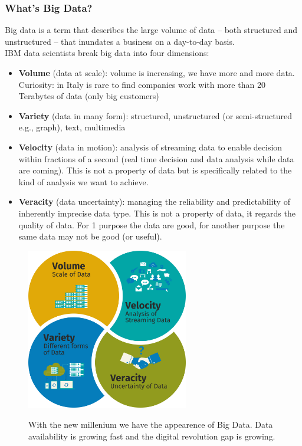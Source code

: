 \documentclass[10pt,a4paper]{article}
\begin{document}
\subsubsection{What's Big Data?}
Big data is a term that describes the large volume of data – both structured and unstructured – that inundates a business on a day-to-day basis. \\
IBM data scientists break big data into four dimensions: 
\begin{itemize}
	\item \textbf{Volume} (data at scale): volume is increasing, we have more and more data. Curiosity: in Italy is rare to find companies work with more than 20 Terabytes of data (only big customers)
	\item \textbf{Variety} (data in many form): structured, unstructured (or semi-structured e.g., graph), text, multimedia
	\item \textbf{Velocity} (data in motion): analysis of streaming data to enable decision within fractions of a second (real time decision and data analysis while data are coming). This is not a property of data but is specifically related to the kind of analysis we want to achieve.
	\item \textbf{Veracity} (data uncertainty): managing the reliability and predictability of inherently imprecise data type. This is not a property of data, it regards the quality of data. For 1 purpose the data are good, for another purpose the same data may not be good (or useful).
\end{itemize}
\begin{figure}[h!]
 \hfill \includegraphics[width=200pt]{images/4v.png}\hspace*{\fill}
  \label{fig:4v}
  \caption{With the new millenium we have the appearence of Big Data. Data availability is growing fast and the digital revolution gap is growing.}
\end{figure}
\end{document}
